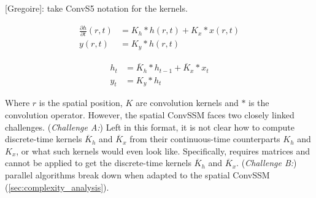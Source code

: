 \documentclass{article}
\newcommand{\greg}[1]{{\color{indigo}[Gregoire]: #1}}
\begin{document}
\greg{take ConvS5 notation for the kernels.}

\begin{minipage}[t]{.45\linewidth}
\vspace{-5mm}
  \begin{subequations}
    \label{eq:conv_ssm_continuous}
    \begin{align}
    \label{eq:conv_ssm_continuous:1}
      \frac{\partial h}{\partial t}(r,t) &= K_h \ast h(r, t) + K_x \ast x(r, t) \\
      y(r, t) &= K_y \ast h(r, t)
    \end{align}
  \end{subequations}
\vspace{-5mm}
\end{minipage}%
\begin{minipage}[t]{.45\linewidth}
\vspace{-5mm}
  \begin{subequations}
    \label{eq:conv_ssm_discrete}
    \begin{align}
    \label{eq:conv_ssm_discrete:1}
      h_{t} &= \overline{K}_h \ast h_{t-1} + \overline{K}_x \ast x_t \\
    \label{eq:conv_ssm_discrete:2}
      y_t &= K_y \ast h_t
    \end{align}
  \end{subequations}
\vspace{-5mm}
\end{minipage}

Where $r$ is the spatial position, $K$ are convolution kernels and $\ast$ is the convolution operator. However, the spatial ConvSSM faces two closely linked challenges.
%
(\emph{Challenge A:}) Left in this format, it is not clear how to compute discrete-time kernels $\overline{K}_h$ and $\overline{K}_x$ from their continuous-time counterparts $K_h$ and $K_x$, or what such kernels would even look like. Specifically,  requires matrices and cannot be applied to get the discrete-time kernels $\overline{K}_h$ and $\overline{K}_x$.
%
(\emph{Challenge B:}) parallel algorithms break down when adapted to the spatial ConvSSM (\cref{sec:complexity_analysis}).
\end{document}
